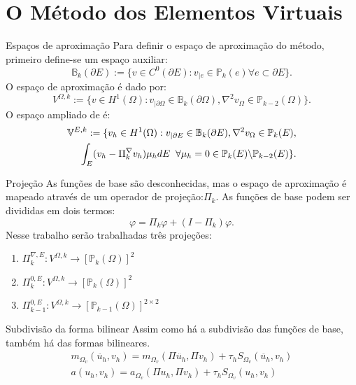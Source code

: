 \documentclass{beamer}
\begin{document}
\section{O Método dos Elementos Virtuais}
\begin{frame}{Espaços de aproximação}
    Para definir o espaço de aproximação do método, primeiro define-se um espaço auxiliar: $$\mathbb{B}_k(\partial E) := \{ v \in C^0(\partial E) : v_{|e} \in \mathbb{P}_k(e) \forall e \subset \partial E \}.$$ \pause
    O espaço de aproximação é dado por: $$V^{\Omega,k}:=\{v \in H^1(\Omega): v_{|\partial\Omega} \in \mathbb{B}_k(\partial\Omega), \nabla^2 v_{\Omega} \in \mathbb{P}_{k-2}(\Omega)\}.$$ \pause 
    O espaço ampliado de \cite{equivalentprojectorsvirtualelementmethods2013a} é:$$\begin{aligned}
        \mathbb{V}^{E,k}:=\{v_h \in H^1(\Omega): v_{|\partial E} \in \mathbb{B}_k(\partial E), \nabla^2 v_{\Omega} \in \mathbb{P}_{k}(E), \\ \int_E (v_h - \Pi_k^\nabla v_h) \mu_h dE \hspace{2mm} \forall\mu_h =0 \in \mathbb{P}_k(E)\backslash \mathbb{P}_{k-2}(E) \}.
    \end{aligned}$$
\end{frame}

\begin{frame}{Projeção}
    As funções de base são desconhecidas, mas o espaço de aproximação é mapeado através de um operador de projeção:$\Pi_k$.
    As funções de base podem ser divididas em dois termos:$$\varphi=\Pi_k\varphi + (I -\Pi_k)\varphi.$$ 
    Nesse trabalho serão trabalhadas três projeções:
    \begin{enumerate}
        \item $\Pi_k^{\nabla,E}: V^{\Omega,k} \rightarrow \left[\mathbb{P}_k(\Omega)\right]^2$
        \item $\Pi_k^{0,E}: V^{\Omega,k} \rightarrow \left[\mathbb{P}_k(\Omega)\right]^2$
        \item $\Pi_{k-1}^{0,E}: V^{\Omega,k} \rightarrow \left[\mathbb{P}_{k-1}(\Omega)\right]^{2 \times 2}$
    \end{enumerate}
\end{frame}

\begin{frame}{Subdivisão da forma bilinear}
    Assim como há a subdivisão das funções de base, também há das formas bilineares. $$\begin{aligned}
        m_{\Omega_v}(\ddot{u_h},v_h) = m_{\Omega_v}(\Pi\ddot{u_h},\Pi v_h) + \tau_h S_{\Omega_v}(\ddot{u_h},v_h) \\
        a(u_h,v_h) = a_{\Omega_v}(\Pi u_h,\Pi v_h) + \tau_h S_{\Omega_v}(u_h,v_h)
    \end{aligned}$$
\end{frame}
\end{document}
